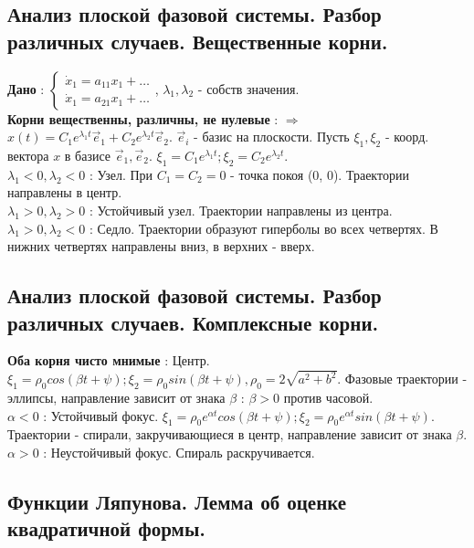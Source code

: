 \documentclass[unicode, 8pt, a4paper,oneside, landscape]{article}
\begin{document}
\begin{multicols}{4}
\subsection{Анализ плоской фазовой системы. Разбор различных случаев. Вещественные корни.}

{\bf Дано} : $\begin{cases}\dot{x}_1 = a_{11}x_1 + \ldots \\ \dot{x}_1 = a_{21}x_1 + \ldots \end{cases}$, $\lambda_1, \lambda_2$ - собств значения.\\
{\bf Корни вещественны, различны, не нулевые} : $\Rightarrow$ $x(t) = C_1e^{\lambda_1 t}\vec{e}_1 + C_2e^{\lambda_2 t}\vec{e}_2$. $\vec{e}_i$ - базис на плоскости. Пусть $\xi_1, \xi_2$ - коорд. вектора $x$ в базисе $\vec{e}_1, \vec{e}_2$. $\xi_1 = C_1e^{\lambda_1t}; \xi_2 = C_2e^{\lambda_2t}$.\\
{\bf $\lambda_1 < 0, \lambda_2 < 0$} : Узел. При $C_1 = C_2 = 0$ - точка покоя (0, 0). Траектории направлены в центр.\\
{\bf $\lambda_1 > 0, \lambda_2 > 0$} : Устойчивый узел. Траектории направлены из центра.\\
{\bf $\lambda_1 > 0, \lambda_2 < 0$} : Седло. Траектории образуют гиперболы во всех четвертях. В нижних четвертях направлены вниз, в верхних - вверх.\\

\subsection{Анализ плоской фазовой системы. Разбор различных случаев. Комплексные корни.}

{\bf Оба корня чисто мнимые} : Центр. $\xi_1 = \rho_0cos(\beta t + \psi); \xi_2 = \rho_0sin(\beta t + \psi), \rho_0 = 2\sqrt{a^2 + b^2}$. Фазовые траектории - эллипсы, направление зависит от знака $\beta$ : $\beta > 0$ против часовой.\\
{\bf $\alpha < 0$} : Устойчивый фокус. $\xi_1 = \rho_0e^{\alpha t} cos(\beta t + \psi); \xi_2 = \rho_0 e^{\alpha t} sin(\beta t + \psi)$. Траектории - спирали, закручивающиеся в центр, направление зависит от знака $\beta$.\\
{\bf $\alpha > 0$} : Неустойчивый фокус. Спираль раскручивается.\\

\subsection{Функции Ляпунова. Лемма об оценке квадратичной формы.}


\end{multicols}
\end{document}
